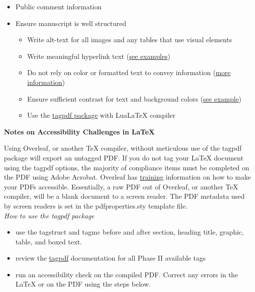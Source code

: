 \begin{titlepage}
\begin{multicols}{2}
\begin{itemize}[nospace]
\begin{itemize}[nospace]
\item[\ding{114}] Public comment information
\end{itemize}
\end{itemize}
\begin{itemize}[nospace]
   \item  Ensure manuscript is well structured
  \begin{itemize}[nospace]
  \item[\ding{114}] Write alt-text for all images and any tables that use visual elements 
  \item[\ding{114}] Write meaningful hyperlink text (\href{https://webaim.org/techniques/hypertext/link_text}{see examples})
  \item[\ding{114}] Do not rely on color or formatted text to convey information (\href{https://www.w3.org/WAI/WCAG21/quickref/?versions=2.0#qr-visual-audio-contrast-without-color}{more information})
  \item[\ding{114}] Ensure sufficient contrast for text and background colors (\href{https://webaim.org/articles/contrast/}{see example})
  \item[\ding{114}] Use the \href{https://github.com/u-fischer/tagpdf}{tagpdf package} with LuaLaTeX compiler
 \end{itemize}
  \end{itemize}
\end{multicols}

\textbf{Notes on Accessibility Challenges in LaTeX}

Using Overleaf, or another TeX compiler, without meticulous use of the tagpdf package will export an untagged PDF. If you do not tag your LaTeX document using the tagpdf options, the majority of compliance items must be completed on the PDF using Adobe Acrobat. Overleaf has \href{https://www.overleaf.com/learn/latex/An_introduction_to_tagged_PDF_files%3A_internals_and_the_challenges_of_accessibility}{training} information on how to make your PDFs accessible. Essentially, a raw PDF out of Overleaf, or another TeX compiler, will be a blank document to a screen reader. The PDF metadata used by screen readers is set in the pdfproperties.sty template file.\\
\emph{How to use the tagpdf package}
\begin{itemize}[nospace]
\item use the tagstruct and tagmc before and after section, heading title, graphic, table, and boxed text.
\item review the \href{https://github.com/u-fischer/tagpdf}{tagpdf} documentation for all Phase II available tags
\item run an accessibility check on the compiled PDF. Correct any errors in the LaTeX or on the PDF using the steps below.
\end{itemize}


\end{titlepage}
